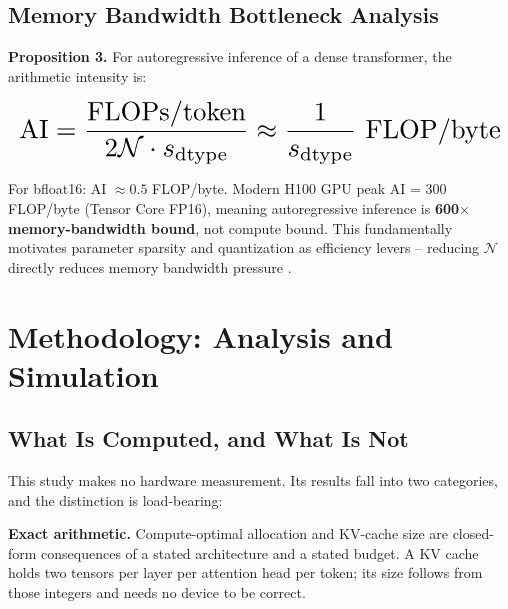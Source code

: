 \documentclass{article}
\begin{document}
\subsection{Memory Bandwidth Bottleneck Analysis}


\textbf{Proposition 3.} For autoregressive inference of a dense transformer, the arithmetic intensity is:















\begin{equation}
\resizebox{\columnwidth}{!}{$\displaystyle
\begin{aligned}
\text{AI} = \frac{\text{FLOPs/token}}{2\mathcal{N} \cdot s_{\text{dtype}}} \approx \frac{1}{s_{\text{dtype}}} \text{ FLOP/byte}
\end{aligned}
$}
\end{equation}















For bfloat16: AI $\approx 0.5$ FLOP/byte. Modern H100 GPU peak AI = 300 FLOP/byte (Tensor Core FP16), meaning autoregressive inference is \textbf{600$\times$ memory-bandwidth bound}, not compute bound. This fundamentally motivates parameter sparsity and quantization as efficiency levers -- reducing $\mathcal{N}$ directly reduces memory bandwidth pressure \cite{arxiv_2406_00584}.




\section{Methodology: Analysis and Simulation}



\subsection{What Is Computed, and What Is Not}


This study makes no hardware measurement. Its results fall into two categories, and the distinction is load-bearing:

\textbf{Exact arithmetic.} Compute-optimal allocation and KV-cache size are closed-form consequences of a stated architecture and a stated budget. A KV cache holds two tensors per layer per attention head per token; its size follows from those integers and needs no device to be correct.
\end{document}
